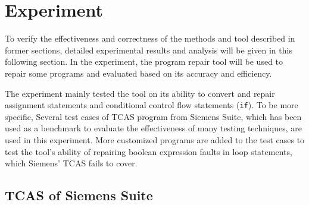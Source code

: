 \section{Experiment}
\label{section:Experiment}
To verify the effectiveness and correctness of the methods and tool described in former sections, detailed experimental results and analysis will be given in this following section.
In the experiment, the program repair tool will be used to repair some programs and evaluated based on its accuracy and efficiency.

The experiment mainly tested the tool on its ability to convert and repair assignment statements and conditional control flow statements (\lstinline|if|).
To be more specific, Several test cases of TCAS program from Siemens Suite, which has been used as a benchmark to evaluate the effectiveness of many testing techniques, are used in this experiment. More customized programs are added to the test cases to test the tool's ability of repairing boolean expression faults in loop statements, which Siemens' TCAS fails to cover.

\subsection{TCAS of Siemens Suite}
